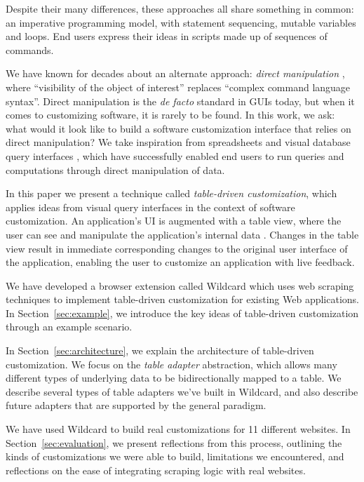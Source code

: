 \documentclass[sigplan,screen,10pt,anonymous,review]{acmart}
\begin{document}
Despite their many differences, these approaches all share something in
common: an imperative programming model, with statement sequencing,
mutable variables and loops. End users express their ideas in scripts
made up of sequences of commands.

We have known for decades about an alternate approach: \emph{direct
manipulation} \citep{shneiderman1983}, where ``visibility of the object
of interest'' replaces ``complex command language syntax''. Direct
manipulation is the \emph{de facto} standard in GUIs today, but when it
comes to customizing software, it is rarely to be found. In this work,
we ask: what would it look like to build a software customization
interface that relies on direct manipulation? We take inspiration from
spreadsheets and visual database query interfaces
\citep{2020a, bakke2016}, which have successfully enabled end users to
run queries and computations through direct manipulation of data.

In this paper we present a technique called \emph{table-driven
customization}, which applies ideas from visual query interfaces in the
context of software customization. An application's UI is augmented with
a table view, where the user can see and manipulate the application's
internal data . Changes in the table view result in immediate
corresponding changes to the original user interface of the application,
enabling the user to customize an application with live feedback.

We have developed a browser extension called Wildcard which uses web
scraping techniques to implement table-driven customization for existing
Web applications. In Section~\ref{sec:example}, we introduce the key
ideas of table-driven customization through an example scenario.

In Section~\ref{sec:architecture}, we explain the architecture of
table-driven customization. We focus on the \emph{table adapter}
abstraction, which allows many different types of underlying data to be
bidirectionally mapped to a table. We describe several types of table
adapters we've built in Wildcard, and also describe future adapters that
are supported by the general paradigm.

We have used Wildcard to build real customizations for 11 different
websites. In Section~\ref{sec:evaluation}, we present reflections from
this process, outlining the kinds of customizations we were able to
build, limitations we encountered, and reflections on the ease of
integrating scraping logic with real websites.
\end{document}
